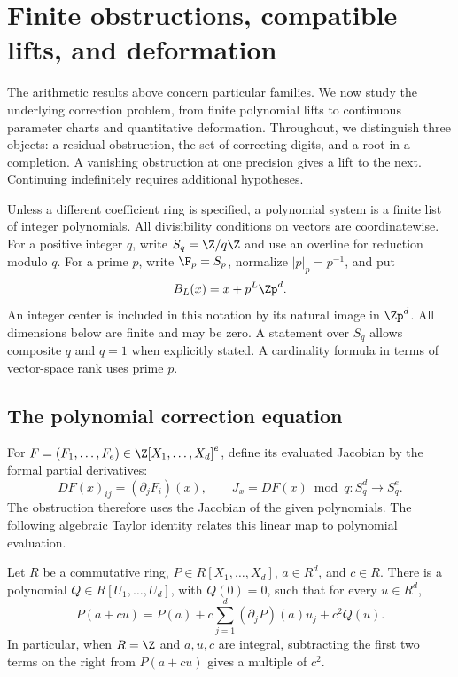 \section{Finite obstructions, compatible lifts, and deformation}
\label{sec:lifting}

The arithmetic results above concern particular families. We now study the
underlying correction problem, from finite polynomial lifts to continuous
parameter charts and quantitative deformation. Throughout, we distinguish
three objects: a residual obstruction, the set of correcting digits, and a
root in a completion. A vanishing obstruction at one precision gives a lift
to the next. Continuing indefinitely requires additional hypotheses.

Unless a different coefficient ring is specified, a polynomial system is a
finite list of integer polynomials. All divisibility conditions on vectors are
coordinatewise. For a positive integer $q$, write $S_q=\Z/q\Z$ and use an
overline for reduction modulo $q$. For a prime $p$, write
$\F_p=S_p$, normalize $|p|_p=p^{-1}$, and put
\[
 B_L(x)=x+p^L\Zp^d.
\]
An integer center is included in this notation by its natural image in
$\Zp^d$. All dimensions below are finite and may be zero. A statement over
$S_q$ allows composite $q$ and $q=1$ when explicitly stated. A cardinality
formula in terms of vector-space rank uses prime $p$.

\subsection{The polynomial correction equation}

For $F=(F_1,\ldots,F_e)\in\Z[X_1,\ldots,X_d]^e$, define its evaluated
Jacobian by the formal partial derivatives:
\[
 DF(x)_{ij}=(\partial_jF_i)(x),\qquad
 J_x=DF(x)\bmod q:S_q^d\longrightarrow S_q^e.
\]
The obstruction therefore uses the Jacobian of the given polynomials. The
following algebraic Taylor identity relates this linear map to polynomial
evaluation.

\begin{lemma}\label{lem:polynomial-taylor}
Let $R$ be a commutative ring, $P\in R[X_1,\ldots,X_d]$, $a\in R^d$, and
$c\in R$. There is a polynomial $Q\in R[U_1,\ldots,U_d]$, with $Q(0)=0$,
such that for every $u\in R^d$,
\begin{equation}\label{eq:polynomial-taylor}
 P(a+cu)=P(a)+c\sum_{j=1}^d(\partial_jP)(a)u_j+c^2Q(u).
\end{equation}
In particular, when $R=\Z$ and $a,u,c$ are integral, subtracting the first
two terms on the right from $P(a+cu)$ gives a multiple of $c^2$.
\end{lemma}


